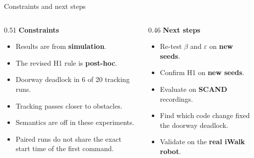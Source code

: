 \documentclass[aspectratio=169,11pt]{beamer}
\begin{document}
\begin{frame}{Constraints and next steps}
  \begin{columns}[T,totalwidth=\textwidth]
    \begin{column}{0.51\textwidth}
      \footnotesize
      \textbf{\textcolor{HeronRed}{Constraints}}
      \begin{itemize}\setlength{\itemsep}{3pt}
        \item Results are from \textbf{simulation}.
        \item The revised H1 rule is \textbf{post-hoc}.
        \item Doorway deadlock in 6 of 20 tracking runs.
        \item Tracking passes closer to obstacles.
        \item Semantics are off in these experiments.
        \item Paired runs do not share the exact start time of the first command.
      \end{itemize}
    \end{column}
    \begin{column}{0.46\textwidth}
      \footnotesize
      \textbf{\textcolor{HeronGreen}{Next steps}}
      \begin{itemize}\setlength{\itemsep}{3pt}
        \item Re-test $\beta$ and $\varepsilon$ on \textbf{new seeds}.
        \item Confirm H1 on \textbf{new seeds}.
        \item Evaluate on \textbf{SCAND} recordings.
        \item Find which code change fixed the doorway deadlock.
        \item Validate on the \textbf{real iWalk robot}.
      \end{itemize}
    \end{column}
  \end{columns}
  \vfill
  \begin{center}
  \end{center}
\end{frame}
\end{document}
